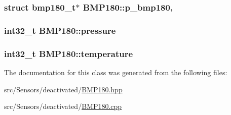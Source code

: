 \subsubsection[{\texorpdfstring{p\+\_\+bmp180}{p_bmp180}}]{\setlength{\rightskip}{0pt plus 5cm}struct {\bf bmp180\+\_\+t}$\ast$ B\+M\+P180\+::p\+\_\+bmp180\hspace{0.3cm}{\ttfamily [static]}, {\ttfamily [private]}}\hypertarget{classBMP180_a309219d172cffdc7b8f3c667666acfb3}{}\label{classBMP180_a309219d172cffdc7b8f3c667666acfb3}
\subsubsection[{\texorpdfstring{pressure}{pressure}}]{\setlength{\rightskip}{0pt plus 5cm}int32\+\_\+t B\+M\+P180\+::pressure\hspace{0.3cm}{\ttfamily [private]}}\hypertarget{classBMP180_a981e771ad28cb9cf1d789f33b45a9521}{}\label{classBMP180_a981e771ad28cb9cf1d789f33b45a9521}
\subsubsection[{\texorpdfstring{temperature}{temperature}}]{\setlength{\rightskip}{0pt plus 5cm}int32\+\_\+t B\+M\+P180\+::temperature\hspace{0.3cm}{\ttfamily [private]}}\hypertarget{classBMP180_af1ffd1d5faf651b0ab03011112e8822c}{}\label{classBMP180_af1ffd1d5faf651b0ab03011112e8822c}


The documentation for this class was generated from the following files\+:\begin{DoxyCompactItemize}
\item 
src/\+Sensors/deactivated/\hyperlink{BMP180_8hpp}{B\+M\+P180.\+hpp}\item 
src/\+Sensors/deactivated/\hyperlink{BMP180_8cpp}{B\+M\+P180.\+cpp}\end{DoxyCompactItemize}
